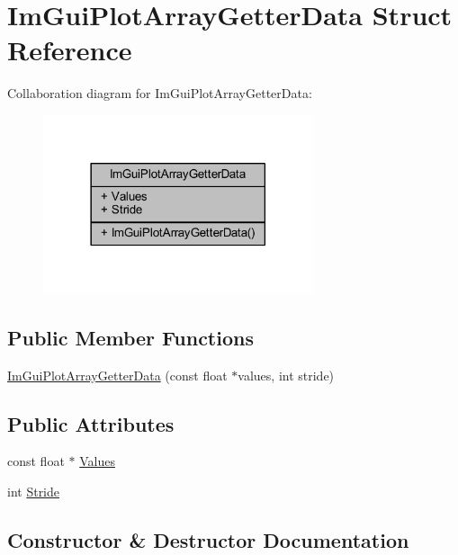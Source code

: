 \hypertarget{struct_im_gui_plot_array_getter_data}{}\section{Im\+Gui\+Plot\+Array\+Getter\+Data Struct Reference}
\label{struct_im_gui_plot_array_getter_data}


Collaboration diagram for Im\+Gui\+Plot\+Array\+Getter\+Data\+:
\nopagebreak
\begin{figure}[H]
\begin{center}
\leavevmode
\includegraphics[width=225pt]{struct_im_gui_plot_array_getter_data__coll__graph}
\end{center}
\end{figure}
\subsection*{Public Member Functions}
\begin{DoxyCompactItemize}
\item 
\mbox{\hyperlink{struct_im_gui_plot_array_getter_data_a9c4037621f1c247957c04dc8ae1f2903}{Im\+Gui\+Plot\+Array\+Getter\+Data}} (const float $\ast$values, int stride)
\end{DoxyCompactItemize}
\subsection*{Public Attributes}
\begin{DoxyCompactItemize}
\item 
const float $\ast$ \mbox{\hyperlink{struct_im_gui_plot_array_getter_data_aa40ff2e945549744fc622891089ae0fd}{Values}}
\item 
int \mbox{\hyperlink{struct_im_gui_plot_array_getter_data_aecb2cce4ea91d95ec81937de656cfcd6}{Stride}}
\end{DoxyCompactItemize}


\subsection{Constructor \& Destructor Documentation}
\mbox{\label{struct_im_gui_plot_array_getter_data_a9c4037621f1c247957c04dc8ae1f2903}} 
